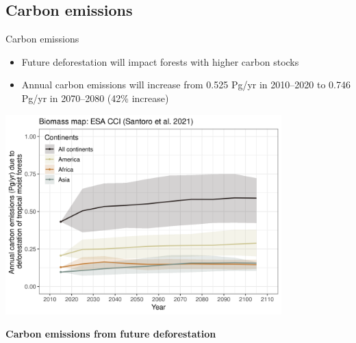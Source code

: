 \documentclass[10pt,table,dvipsnames,compress]{beamer}
\begin{document}
\subsection{Carbon emissions}
\label{sec:org9d43354}
\begin{frame}[label={sec:org678b051}]{Carbon emissions}
\begin{itemize}
\item Future deforestation will impact forests with higher carbon stocks
\item Annual carbon emissions will increase from 0.525 Pg/yr in 2010--2020
to 0.746 Pg/yr in 2070--2080 (42\% increase)
\end{itemize}

\centering \includegraphics[width=0.8\textwidth]{figs/article/C_trend}

\textbf{Carbon emissions from future deforestation}
\end{frame}
\end{document}
